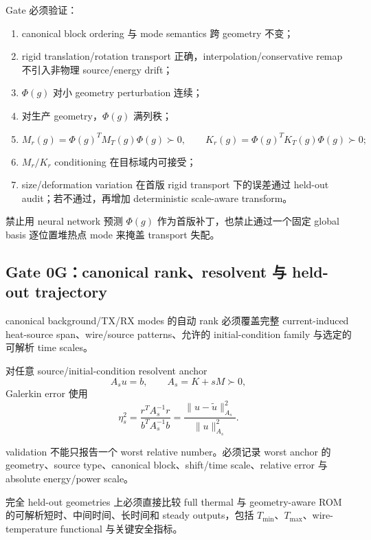 Gate 必须验证：
\begin{enumerate}
  \item canonical block ordering 与 mode semantics 跨 geometry 不变；
  \item rigid translation/rotation transport 正确，interpolation/conservative remap 不引入非物理 source/energy drift；
  \item $\Phi(g)$ 对小 geometry perturbation 连续；
  \item 对生产 geometry，$\Phi(g)$ 满列秩；
  \item
  \begin{equation}
  M_r(g)=\Phi(g)^TM_T(g)\Phi(g)\succ0,
  \qquad
  K_r(g)=\Phi(g)^TK_T(g)\Phi(g)\succ0;
  \end{equation}
  \item $M_r/K_r$ conditioning 在目标域内可接受；
  \item size/deformation variation 在首版 rigid transport 下的误差通过 held-out audit；若不通过，再增加 deterministic scale-aware transform。
\end{enumerate}

禁止用 neural network 预测 $\Phi(g)$ 作为首版补丁，也禁止通过一个固定 global basis 逐位置堆热点 mode 来掩盖 transport 失配。

\subsection{Gate 0G：canonical rank、resolvent 与 held-out trajectory}
canonical background/TX/RX modes 的自动 rank 必须覆盖完整 current-induced heat-source span、wire/source patterns、允许的 initial-condition family 与选定的可解析 time scales。

对任意 source/initial-condition resolvent anchor
\begin{equation}
A_su=b,\qquad A_s=K+sM\succ0,
\end{equation}
Galerkin error 使用
\begin{equation}
\boxed{
\eta_s^2
=\frac{r^TA_s^{-1}r}{b^TA_s^{-1}b}
=\frac{\|u-\tilde u\|_{A_s}^2}{\|u\|_{A_s}^2}.
}
\end{equation}

validation 不能只报告一个 worst relative number。必须记录 worst anchor 的 geometry、source type、canonical block、shift/time scale、relative error 与 absolute energy/power scale。

完全 held-out geometries 上必须直接比较 full thermal 与 geometry-aware ROM 的可解析短时、中间时间、长时间和 steady outputs，包括 $T_{\min}$、$T_{\max}$、wire-temperature functional 与关键安全指标。

